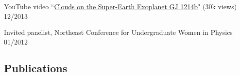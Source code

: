 \documentclass[12pt,letterpaper]{article}
\begin{document}
\begin{compactitem}[]
\item YouTube video ``\href{https://www.youtube.com/watch?v=8x2DcgZiKTA}{Clouds on the Super-Earth Exoplanet GJ 1214b}" (30k views) \hfill 12/2013
\item Invited panelist, Northeast Conference for Undergraduate Women in Physics \hfill 01/2012
\end{compactitem}

\newpage
\subsection*{Publications}                              
\end{document}
